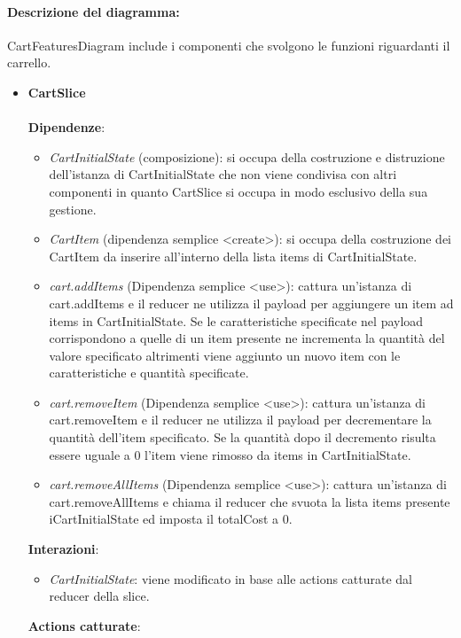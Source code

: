 \paragraph*{Descrizione del diagramma:}
CartFeaturesDiagram include i componenti che svolgono le funzioni riguardanti il carrello.
\begin{itemize}
		\item \textbf{CartSlice}
		\\\\
		\textbf{Dipendenze}:
		\begin{itemize}
			\item \textit{CartInitialState} (composizione): si occupa della costruzione e distruzione dell'istanza di CartInitialState
			che non viene condivisa con altri componenti in quanto CartSlice si occupa in modo esclusivo della sua gestione.
			\item \textit{CartItem} (dipendenza semplice \textless create\textgreater): si occupa della costruzione dei CartItem 
			da inserire all'interno della lista items di CartInitialState.
			\item \textit{cart.addItems} (Dipendenza semplice \textless use\textgreater): cattura un'istanza di cart.addItems e il 
			reducer ne utilizza il payload per aggiungere un item ad items in CartInitialState.
			Se le caratteristiche specificate nel payload corrispondono a quelle di un item presente ne incrementa la quantità 
			del valore specificato altrimenti viene aggiunto un nuovo item con le caratteristiche e quantità specificate.  
			\item \textit{cart.removeItem} (Dipendenza semplice \textless use\textgreater): cattura un'istanza di cart.removeItem e il reducer
			ne utilizza il payload per decrementare la quantità dell'item specificato.
			Se la quantità dopo il decremento risulta essere uguale a 0 l'item viene rimosso da items in CartInitialState.
			\item \textit{cart.removeAllItems} (Dipendenza semplice \textless use\textgreater): cattura un'istanza di cart.removeAllItems e chiama il reducer 
			che svuota la lista items presente iCartInitialState ed imposta il totalCost a 0.
		\end{itemize}
		\textbf{Interazioni}:
		\begin{itemize}
			\item \textit{CartInitialState}: viene modificato in base alle actions catturate dal reducer della slice.
		\end{itemize}
		\textbf{Actions catturate}:
		\begin{itemize}

\end{itemize}
\end{itemize}
